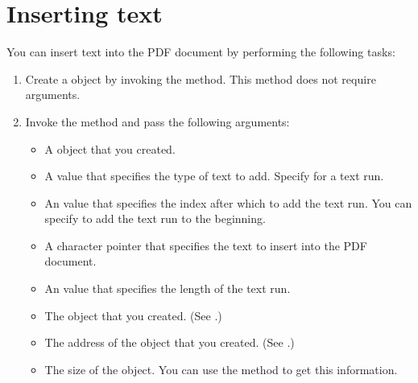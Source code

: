 \documentclass[letterpaper,12pt,english,openany,oneside]{sphinxmanual}
\begin{document}
\section{Inserting text}
\label{\detokenize{Plugins_Insertext:inserting-text}}
You can insert text into the PDF document by performing the following tasks:
\begin{enumerate}
%
\item {} 
Create a  object by invoking the  method. This method does not require arguments.

\item {} 
Invoke the  method and pass the following arguments:
\begin{itemize}
\item {} 
A  object that you created.

\item {} 
A  value that specifies the type of text to add. Specify  for a text run.

\item {} 
An  value that specifies the index after which to add the text run. You can specify  to add the text run to the beginning.

\item {} 
A character pointer that specifies the text to insert into the PDF document.

\item {} 
An  value that specifies the length of the text run.

\item {} 
The  object that you created. (See .)

\item {} 
The address of the  object that you created. (See .)

\item {} 
The size of the  object. You can use the  method to get this information.


\end{itemize}
\end{enumerate}
\end{document}
